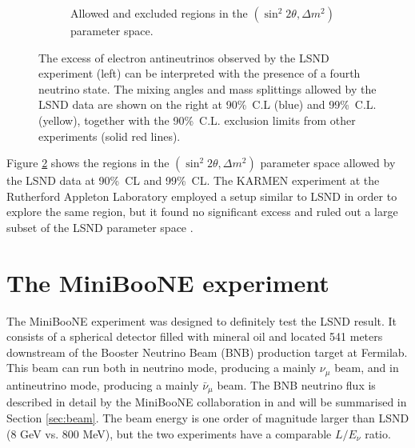\begin{figure}[htbp]
\begin{subfigure}{0.45\textwidth}
\begin{center}
        \caption{Allowed and excluded regions in the $(\sin^2 2\theta, \Delta m^2)$ parameter space.}\label{fig:lsnd_space}
    \end{center}
  \end{subfigure}
    \caption{The excess of electron antineutrinos observed by the LSND experiment (left) can be interpreted with the presence of a fourth neutrino state. The mixing angles and mass splittings allowed by the LSND data are shown on the right at 90\%~C.L (blue) and 99\%~C.L. (yellow), together with the 90\%~C.L. exclusion limits from other experiments (solid red lines).}
\end{figure}

Figure \ref{fig:lsnd_space} shows the regions in the $(\sin^2 2\theta, \Delta m^2)$ parameter space allowed by the LSND data at 90\%~CL and 99\%~CL. %
The KARMEN experiment at the Rutherford Appleton Laboratory employed a setup similar to LSND in order to explore the same region, but it found no significant excess and ruled out a large subset of the LSND parameter space \cite{Eitel:2000by}. 

\section{The MiniBooNE experiment}\label{sec:miniboone}
The MiniBooNE experiment was designed to definitely test the LSND result. It consists of a spherical detector filled with mineral oil and located 541 meters downstream of the Booster Neutrino Beam (BNB) production target at Fermilab. This beam can run both in neutrino mode, producing a mainly $\nu_{\mu}$ beam, and in antineutrino mode, producing a mainly $\bar{\nu}_{\mu}$ beam. The BNB neutrino flux is described in detail by the MiniBooNE collaboration in \cite{AguilarArevalo:2008yp} and will be summarised in Section \ref{sec:beam}. The beam energy is one order of magnitude larger than LSND (8 GeV vs. 800 MeV), but the two experiments have a comparable $L/E_{\nu}$ ratio.

